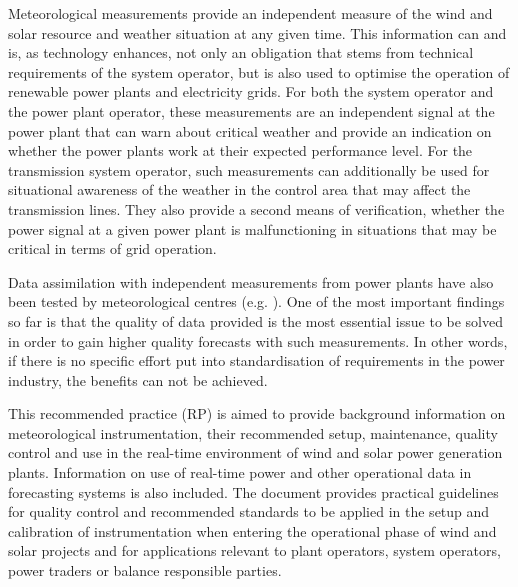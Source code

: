 Meteorological measurements provide an independent measure of the wind and solar resource and weather situation at any given time. This information can and is, as technology enhances, not only an obligation that stems from technical requirements of the system operator, but is also used to optimise the operation of renewable power plants and electricity grids.
For both the system operator and the power plant operator, these measurements are an independent signal at the power plant that can warn about critical weather and provide an indication on whether the power plants work at their expected performance level. For the transmission system operator, such measurements can additionally be used for situational awareness of the weather in the control area that may affect the transmission lines. They also provide a second means of verification, whether the power signal at a given power plant is malfunctioning in situations that may be critical in terms of grid operation.

Data assimilation with independent measurements from power plants have also been tested by meteorological centres (e.g. \cite{Marquis2012,EWELINE2011}). One of the most important findings so far is that the quality of data provided is the most essential issue to be solved in order to gain higher quality forecasts with such measurements. In other words, if there is no specific effort put into standardisation of requirements in the power industry, the benefits can not be achieved.

This recommended practice (RP) is aimed to provide background information on meteorological instrumentation, their recommended setup, maintenance, quality control and use in the real-time environment of wind and solar power generation plants. Information on use of real-time power and other operational data in forecasting systems is also included.  The document provides practical guidelines for quality control and recommended standards to be applied in the setup and calibration of instrumentation  when entering the operational phase of wind and solar projects and for applications  relevant to plant operators, system operators, power traders or balance responsible parties. 


